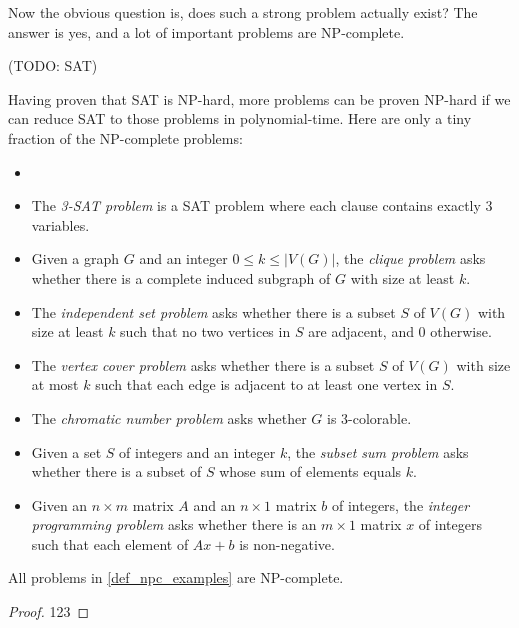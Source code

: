         Now the obvious question is, does such a strong problem actually exist? The answer is yes, and a lot of important problems are NP-complete.
        
        (TODO: SAT)
        
        Having proven that SAT is NP-hard, more problems can be proven NP-hard if we can reduce SAT to those problems in polynomial-time. Here are only a tiny fraction of the NP-complete problems:
        
        \begin{defn} \label{def_npc_examples} \begin{itemize}
            \item[]
            \item The \emph{3-SAT problem} is a SAT problem where each clause contains exactly 3 variables.
            \item Given a graph $G$ and an integer $0 \leq k \leq |V(G)|$, the \emph{clique problem} asks whether there is a complete induced subgraph of $G$ with size at least $k$.
            \item The \emph{independent set problem} asks whether there is a subset $S$ of $V(G)$ with size at least $k$ such that no two vertices in $S$ are adjacent, and 0 otherwise.
            \item The \emph{vertex cover problem} asks whether there is a subset $S$ of $V(G)$ with size at most $k$ such that each edge is adjacent to at least one vertex in $S$.
            \item The \emph{chromatic number problem} asks whether $G$ is 3-colorable.
            \item Given a set $S$ of integers and an integer $k$, the \emph{subset sum problem} asks whether there is a subset of $S$ whose sum of elements equals $k$.
            \item Given an $n \times m$ matrix $A$ and an $n \times 1$ matrix $b$ of integers, the \emph{integer programming problem} asks whether there is an $m \times 1$ matrix $x$ of integers such that each element of $Ax+b$ is non-negative.
        \end{itemize}
        \end{defn}
        
        \begin{thm} \label{thm_npc_examples}
            All problems in \ref{def_npc_examples} are NP-complete.
        \end{thm}
        
        \begin{proof}
            123
        \end{proof}
